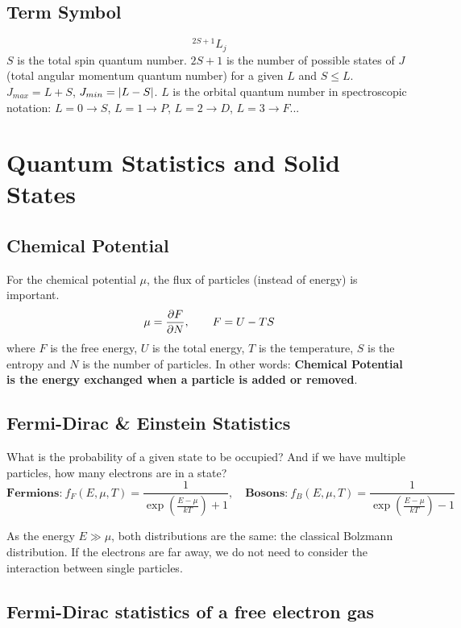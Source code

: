 \documentclass[a4paper, 9pt]{extarticle}
\begin{document}
\subsection{Term Symbol}

$$^{2S+1}L_j$$
$S$ is the total spin quantum number. $2S+1$ is the number of possible states of $J$ (total angular momentum quantum number) for a given $L$ and $S \leq L$. $J_{max} = L + S$, $J_{min} = \left| L-S \right|$. $L$ is the orbital quantum number in spectroscopic notation: $L=0 \rightarrow S$, $L=1 \rightarrow P$, $L=2 \rightarrow D$, $L=3 \rightarrow F$...

\section{Quantum Statistics and Solid States}

\subsection{Chemical Potential}

For the chemical potential $\mu$, the flux of particles (instead of energy) is important. 
$$\mu = \frac{\partial F}{\partial N}, \qquad F = U - TS$$
where $F$ is the free energy, $U$ is the total energy, $T$ is the temperature, $S$ is the entropy and $N$ is the number of particles. In other words: \textbf{Chemical Potential is the energy exchanged when a particle is added or removed}.

\subsection{Fermi-Dirac \& Einstein Statistics}

What is the probability of a given state to be occupied? And if we have multiple particles, how many electrons are in a state?
$$\textbf{Fermions:} \ f_F(E, \mu, T) = \frac{1}{\exp \left( \frac{E-\mu}{kT} \right) + 1}, \quad \textbf{Bosons:} \ f_B(E, \mu, T) = \frac{1}{\exp \left( \frac{E-\mu}{kT} \right) - 1}$$  

As the energy $E \gg \mu$, both distributions are the same: the classical Bolzmann distribution. If the electrons are far away, we do not need to consider the interaction between single particles. 

\subsection{Fermi-Dirac statistics of a free electron gas}
\end{document}
